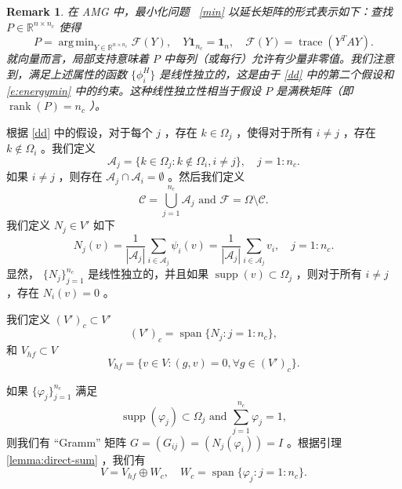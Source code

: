 \documentclass[12pt]{acta_2011xz}
\newcommand{\trace}{\ensuremath{\operatorname{trace}}}
\DeclareMathOperator*{\argmin}{arg\,min}
\newtheorem{remark}[theorem]{Remark}
\begin{document}
   \begin{remark}在 AMG 中，最小化问题~    \eqref{min}    以延长矩阵的形式表示如下：查找
   $P\in \mathbb{R}^{n\times n_c}$    使得
   \begin{equation}\label{e:energymin} 
P=\argmin_{Y\in \mathbb{R}^{n\times n_c}}\mathcal{F}(Y), 
\quad Y\bm{1}_{n_c} = \bm{1}_n,\quad \mathcal{F}(Y) = 
\trace(Y^TAY). 
\end{equation}    就向量而言，局部支持意味着    $P$    中每列（或每行）允许有少量非零值。我们注意到，满足上述属性的函数
   $ \{ \phi_i^H \} $    是线性独立的，这是由于    \eqref{dd}    中的第二个假设和~    \eqref{e:energymin}    中的约束。这种线性独立性相当于假设    $P$    是满秩矩阵（即    $\operatorname{rank}(P)=n_c$   ）。  \end{remark}     

根据    \eqref{dd}    中的假设，对于每个    $j$    ，存在    $k\in \Omega_j$    ，使得对于所有    $i\neq j$    ，存在    $k\notin \Omega_i$    。我们定义 
   \begin{equation*}
    \mathcal A_j= \{ k\in \Omega_j: k\notin \Omega_i, i\neq j \} , \quad j=1: n_c.
\end{equation*}    如果    $i\neq j$    ，则存在    $\mathcal A_j\cap \mathcal A_i=\emptyset$    。然后我们定义 
   \begin{equation*}
    \mathcal C = \bigcup_{j=1}^{n_c} \mathcal A_j \text{ and } \mathcal F=\Omega\setminus \mathcal C.
\end{equation*}    我们定义    $N_j\in V'$    如下
   \begin{equation*}
    N_j(v)=\frac{1}{|\mathcal A_j|}\sum_{i\in \mathcal A_j}\psi_i(v)=\frac{1}{|\mathcal A_j|}\sum_{i\in \mathcal A_j}v_i, \quad j= 1:n_c.
\end{equation*}    显然，   $ \{ N_j \} _{j=1}^{n_c}$    是线性独立的，并且如果    $\operatorname{supp}(v)\subset \Omega_j$    ，则对于所有    $i\neq j$    ，存在    $N_i(v)=0$    。  

我们定义    $(V')_c\subset V'$    
   \begin{equation*}
    (V')_c=\operatorname{span} \{ N_j: j=1:n_c \} ,
\end{equation*}    和    $V_{hf}\subset V$    
   \begin{equation*}
    V_{hf}= \{ v\in V: (g, v)=0, \forall g\in (V')_c \} .
\end{equation*}     

如果    $ \{ \varphi_j \} _{j=1}^{n_c}$    满足
   \begin{equation*}
    \operatorname{supp}(\varphi_j)\subset \Omega_j \text{ and } \sum_{j=1}^{n_c}\varphi_j =1,
\end{equation*}    则我们有 ``Gramm'' 矩阵    $G=(G_{ij})=(N_j(\varphi_i))=I$    。根据引理~    \ref{lemma:direct-sum}    ，我们有
   \begin{equation*}
    V=V_{hf}\oplus W_c, \quad W_c=\operatorname{span} \{ \varphi_j: j=1:n_c \} .
\end{equation*}     
\end{document}
